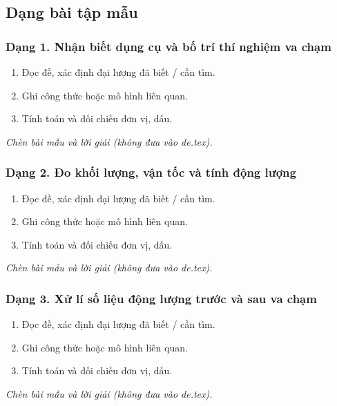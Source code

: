 

\subsection{Dạng bài tập mẫu}
\subsubsection{Dạng 1. Nhận biết dụng cụ và bố trí thí nghiệm va chạm}
\begin{phuongphap}
\begin{enumerate}
\item Đọc đề, xác định đại lượng đã biết / cần tìm.
\item Ghi công thức hoặc mô hình liên quan.
\item Tính toán và đối chiếu đơn vị, dấu.
\end{enumerate}
\end{phuongphap}
\begin{vidumau}
\textit{Chèn bài mẫu và lời giải (không đưa vào de.tex).}
\end{vidumau}

\subsubsection{Dạng 2. Đo khối lượng, vận tốc và tính động lượng}
\begin{phuongphap}
\begin{enumerate}
\item Đọc đề, xác định đại lượng đã biết / cần tìm.
\item Ghi công thức hoặc mô hình liên quan.
\item Tính toán và đối chiếu đơn vị, dấu.
\end{enumerate}
\end{phuongphap}
\begin{vidumau}
\textit{Chèn bài mẫu và lời giải (không đưa vào de.tex).}
\end{vidumau}

\subsubsection{Dạng 3. Xử lí số liệu động lượng trước và sau va chạm}
\begin{phuongphap}
\begin{enumerate}
\item Đọc đề, xác định đại lượng đã biết / cần tìm.
\item Ghi công thức hoặc mô hình liên quan.
\item Tính toán và đối chiếu đơn vị, dấu.
\end{enumerate}
\end{phuongphap}
\begin{vidumau}
\textit{Chèn bài mẫu và lời giải (không đưa vào de.tex).}
\end{vidumau}


